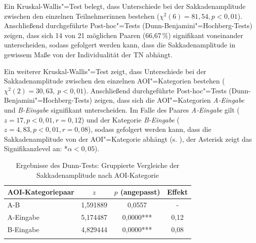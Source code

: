 Ein Kruskal-Wallis"=Test belegt, dass Unterschiede bei der Sakkadenamplitude zwischen den einzelnen Teilnehmer{\textperiodcentered}innen bestehen ($\chi^2(6) = 81,54, p < 0,01$). Anschließend durchgeführte Post-hoc"=Tests (Dunn-Benjamini"=Hochberg-Tests) zeigen, dass sich 14 von 21 möglichen Paaren (66,67\,\%) signifikant voneinander unterscheiden, sodass gefolgert werden kann, dass die Sakkadenamplitude in gewissem Maße von der Individualität der TN abhängt.\largerpage

Ein weiterer Kruskal-Wallis"=Test zeigt, dass Unterschiede bei der Sakkadenamplitude zwischen den einzelnen AOI"=Kategorien bestehen ($\chi^2(2) = 30,63,\allowbreak\ p < 0,01$). Anschließend durchgeführte Post-hoc"=Tests (Dunn-Benjamini"=Hochberg-Tests) zeigen, dass sich die AOI"=Kategorien \emph{A-Eingabe} und \emph{B-Eingabe} signifikant unterscheiden. Im Falle des Paares \emph{A-Eingabe} gilt ($z = 17, p < 0,01, r = 0,12$) und der Kategorie \emph{B-Eingabe} ($z = 4,83, p < 0,01, r = 0,08$), sodass gefolgert werden kann, dass die Sakkadenamplitude von der AOI"=Kategorie abhängt (s. ), der Asterisk zeigt das Signifikanzlevel an: *$ \alpha{} < 0,05$).


\begin{table}
    \begin{tabular}{lS[table-format=1.6]S[table-format=1.4{***}]c}  
    \lsptoprule
        {AOI-Kategoriepaar} & {$z$} & {$p$ (angepasst)} & {Effekt}\\\midrule
        A-B & 1,591889 & 0,0557 & -\\
        A-Eingabe & 5,174487 & 0,0000{***} & 0,12 \\ 
        B-Eingabe  &  4,829444 & 0,0000{***} & 0,08\\ 
        \lspbottomrule
    \end{tabular}
    \caption{Ergebnisse des Dunn-Tests: Gruppierte Vergleiche der Sakkadenamplitude nach AOI-Kategorie\label{tab:DeDe:dunntest-sacamp}}
\end{table}


